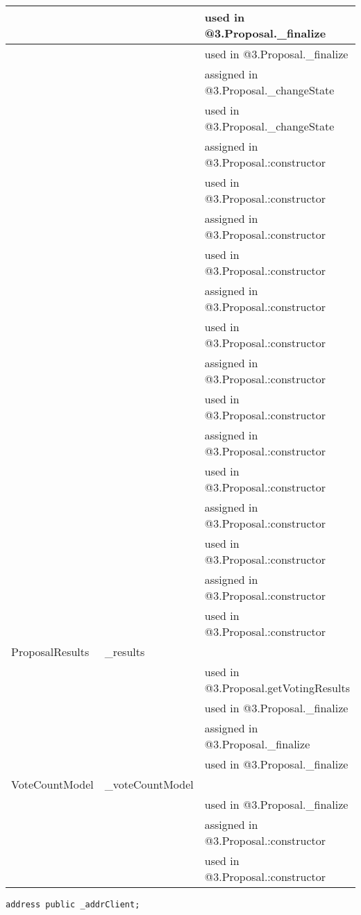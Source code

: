 \begin{tabular}{|l|l|p{5cm}|}
 & & used in @3.Proposal.\_{}finalize\\\hline
 & & used in @3.Proposal.\_{}finalize\\\hline
 & & assigned in @3.Proposal.\_{}changeState\\\hline
 & & used in @3.Proposal.\_{}changeState\\\hline
 & & assigned in @3.Proposal.:constructor\\\hline
 & & used in @3.Proposal.:constructor\\\hline
 & & assigned in @3.Proposal.:constructor\\\hline
 & & used in @3.Proposal.:constructor\\\hline
 & & assigned in @3.Proposal.:constructor\\\hline
 & & used in @3.Proposal.:constructor\\\hline
 & & assigned in @3.Proposal.:constructor\\\hline
 & & used in @3.Proposal.:constructor\\\hline
 & & assigned in @3.Proposal.:constructor\\\hline
 & & used in @3.Proposal.:constructor\\\hline
 & & assigned in @3.Proposal.:constructor\\\hline
 & & used in @3.Proposal.:constructor\\\hline
 & & assigned in @3.Proposal.:constructor\\\hline
 & & used in @3.Proposal.:constructor\\\hline
ProposalResults & \_{}results &  \\\hline
 & & used in @3.Proposal.getVotingResults\\\hline
 & & used in @3.Proposal.\_{}finalize\\\hline
 & & assigned in @3.Proposal.\_{}finalize\\\hline
 & & used in @3.Proposal.\_{}finalize\\\hline
VoteCountModel & \_{}voteCountModel &  \\\hline
 & & used in @3.Proposal.\_{}finalize\\\hline
 & & assigned in @3.Proposal.:constructor\\\hline
 & & used in @3.Proposal.:constructor\\\hline
\end{tabular}
\fi


\begin{lstlisting}[firstnumber=16]
    address public _addrClient;
\end{lstlisting}

